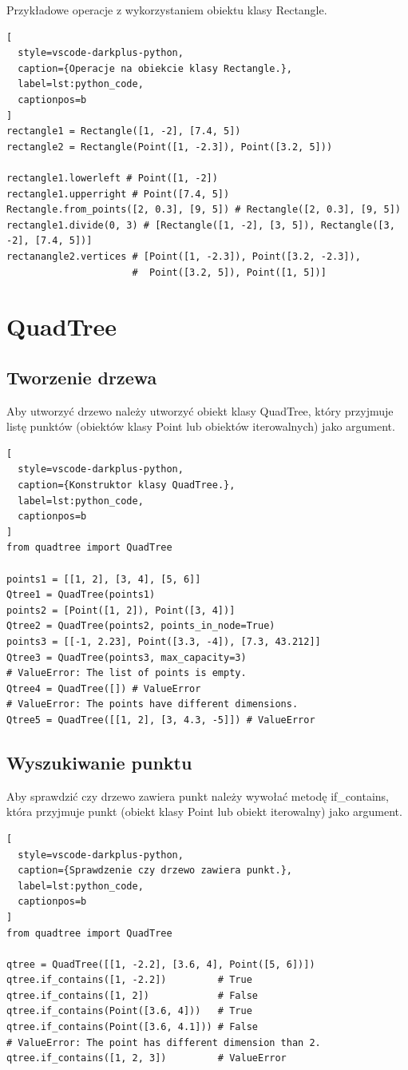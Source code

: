 \documentclass{lab}
\begin{document}
Przykładowe operacje z wykorzystaniem obiektu klasy Rectangle.

\begin{lstlisting}[
  style=vscode-darkplus-python,
  caption={Operacje na obiekcie klasy Rectangle.},
  label=lst:python_code,
  captionpos=b
]
rectangle1 = Rectangle([1, -2], [7.4, 5])
rectangle2 = Rectangle(Point([1, -2.3]), Point([3.2, 5]))

rectangle1.lowerleft # Point([1, -2])
rectangle1.upperright # Point([7.4, 5])
Rectangle.from_points([2, 0.3], [9, 5]) # Rectangle([2, 0.3], [9, 5])
rectangle1.divide(0, 3) # [Rectangle([1, -2], [3, 5]), Rectangle([3, -2], [7.4, 5])]
rectanangle2.vertices # [Point([1, -2.3]), Point([3.2, -2.3]), 
                      #  Point([3.2, 5]), Point([1, 5])]
\end{lstlisting}

\section{QuadTree}
\subsection{Tworzenie drzewa}
Aby utworzyć drzewo należy utworzyć obiekt klasy QuadTree, który przyjmuje listę punktów (obiektów klasy Point lub obiektów iterowalnych) jako argument.
\begin{lstlisting}[
  style=vscode-darkplus-python,
  caption={Konstruktor klasy QuadTree.},
  label=lst:python_code,
  captionpos=b
]
from quadtree import QuadTree

points1 = [[1, 2], [3, 4], [5, 6]]
Qtree1 = QuadTree(points1)
points2 = [Point([1, 2]), Point([3, 4])]
Qtree2 = QuadTree(points2, points_in_node=True)
points3 = [[-1, 2.23], Point([3.3, -4]), [7.3, 43.212]]
Qtree3 = QuadTree(points3, max_capacity=3)
# ValueError: The list of points is empty.
Qtree4 = QuadTree([]) # ValueError
# ValueError: The points have different dimensions.
Qtree5 = QuadTree([[1, 2], [3, 4.3, -5]]) # ValueError
\end{lstlisting}

\subsection{Wyszukiwanie punktu}
Aby sprawdzić czy drzewo zawiera punkt należy wywołać metodę if\_contains, która przyjmuje punkt (obiekt klasy Point lub obiekt iterowalny) jako argument.

\begin{lstlisting}[
  style=vscode-darkplus-python,
  caption={Sprawdzenie czy drzewo zawiera punkt.},
  label=lst:python_code,
  captionpos=b
]
from quadtree import QuadTree

qtree = QuadTree([[1, -2.2], [3.6, 4], Point([5, 6])])
qtree.if_contains([1, -2.2])         # True
qtree.if_contains([1, 2])            # False
qtree.if_contains(Point([3.6, 4]))   # True
qtree.if_contains(Point([3.6, 4.1])) # False
# ValueError: The point has different dimension than 2.
qtree.if_contains([1, 2, 3])         # ValueError
\end{lstlisting}
\end{document}

